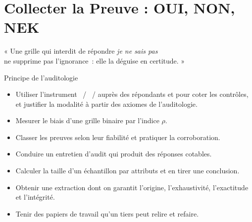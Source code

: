 
\chapter[Collecter la preuve : OUI, NON, NEK]{Collecter la Preuve : OUI, NON, NEK}
\label{chap:preuve}

\epigraph{%
    « Une grille qui interdit de répondre \emph{je ne sais pas}\\
    ne supprime pas l'ignorance~: elle la déguise en certitude. »%
}{Principe de l'auditologie}


\begin{boxobjectifs}
\begin{itemize}
    \item Utiliser l'instrument \OUI{}~/ \NON{}~/ \NEK{} auprès des
          répondants et pour coter les contrôles, et justifier la modalité
          \NEK{} à partir des axiomes de l'auditologie.
    \item Mesurer le biais d'une grille binaire par l'indice $\rho$.
    \item Classer les preuves selon leur fiabilité et pratiquer la
          corroboration.
    \item Conduire un entretien d'audit qui produit des réponses cotables.
    \item Calculer la taille d'un échantillon par attributs et en tirer une
          conclusion.
    \item Obtenir une extraction dont on garantit l'origine, l'exhaustivité,
          l'exactitude et l'intégrité.
    \item Tenir des papiers de travail qu'un tiers peut relire et refaire.
\end{itemize}
\end{boxobjectifs}

